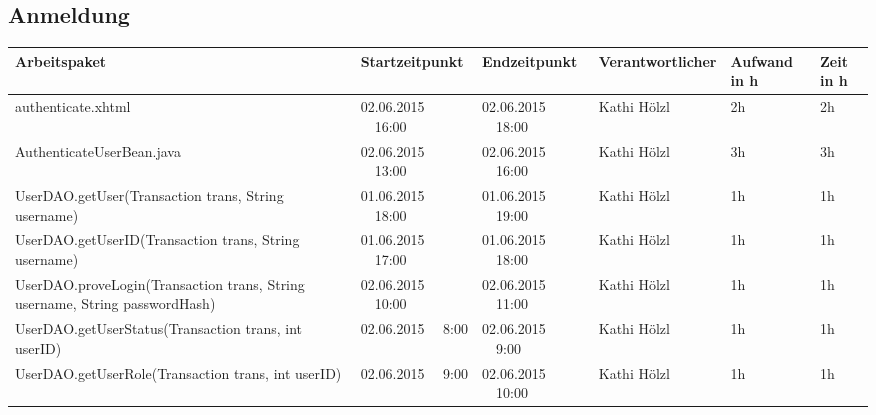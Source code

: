 \begin{landscape}
	\subsection{Anmeldung}
	\begin{tabular}{|p{10.3cm}|p{3.2cm}|p{3.2cm}|p{3.5cm}|p{1.7cm}|p{1.5cm}|}
		\hline  \textbf{Arbeitspaket} & \textbf{Startzeitpunkt} & \textbf{Endzeitpunkt} & \textbf{Verantwortlicher}  & \textbf{Aufwand in h} & \textbf{Zeit in h}\\ 
		\hline   authenticate.xhtml                                   & 02.06.2015 \ \ 16:00     & 02.06.2015 \ \ 18:00     & Kathi Hölzl &      2h      &    2h\\
		\hline   AuthenticateUserBean.java                            & 02.06.2015 \ \ 13:00     & 02.06.2015 \ \ 16:00     & Kathi Hölzl &      3h      &    3h\\
		\hline   UserDAO.getUser(Transaction trans, String username)  & 01.06.2015 \ \ 18:00     & 01.06.2015 \ \ 19:00     & Kathi Hölzl &      1h      &    1h  \\
		\hline   UserDAO.getUserID(Transaction trans, String username)& 01.06.2015 \ \ 17:00     & 01.06.2015 \ \ 18:00     & Kathi Hölzl &      1h      &    1h \\
		\hline   UserDAO.proveLogin(Transaction trans, String username, String passwordHash)& 02.06.2015 \ \ 10:00     & 02.06.2015 \ \ 11:00     & Kathi Hölzl &      1h   &      1h   \\
		\hline   UserDAO.getUserStatus(Transaction trans, int userID)         & 02.06.2015 \ \ 8:00     & 02.06.2015 \ \ 9:00        & Kathi Hölzl  &      1h                   &      1h\\
		\hline   UserDAO.getUserRole(Transaction trans, int userID)           & 02.06.2015 \ \ 9:00     & 02.06.2015 \ \ 10:00       & Kathi Hölzl &      1h      &                  1h \\
		\hline 
	\end{tabular} \ \\
	\ \\
	

\end{landscape}
